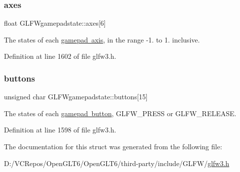 \subsubsection{\texorpdfstring{axes}{axes}}
{\footnotesize\ttfamily float G\+L\+F\+Wgamepadstate\+::axes\mbox{[}6\mbox{]}}

The states of each \mbox{\hyperlink{group__gamepad__axes}{gamepad axis}}, in the range -\/1. to 1. inclusive. 

Definition at line 1602 of file glfw3.\+h.

\mbox{\label{struct_g_l_f_wgamepadstate_a27e9896b51c65df15fba2c7139bfdb9a}} 
\subsubsection{\texorpdfstring{buttons}{buttons}}
{\footnotesize\ttfamily unsigned char G\+L\+F\+Wgamepadstate\+::buttons\mbox{[}15\mbox{]}}

The states of each \mbox{\hyperlink{group__gamepad__buttons}{gamepad button}}, {\ttfamily G\+L\+F\+W\+\_\+\+P\+R\+E\+SS} or {\ttfamily G\+L\+F\+W\+\_\+\+R\+E\+L\+E\+A\+SE}. 

Definition at line 1598 of file glfw3.\+h.



The documentation for this struct was generated from the following file\+:\begin{DoxyCompactItemize}
\item 
D\+:/\+V\+C\+Repos/\+Open\+G\+L\+T6/\+Open\+G\+L\+T6/third-\/party/include/\+G\+L\+F\+W/\mbox{\hyperlink{glfw3_8h}{glfw3.\+h}}\end{DoxyCompactItemize}
